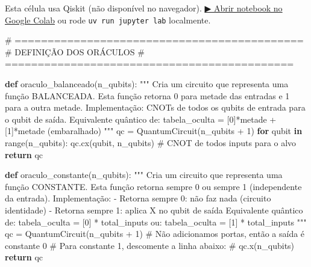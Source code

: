 \documentclass[
  brazilian,
]{report}
\newenvironment{Shaded}{\begin{snugshade}}{\end{snugshade}}
\newcommand{\BuiltInTok}[1]{\textcolor[rgb]{0.00,0.23,0.31}{#1}}
\newcommand{\CommentTok}[1]{\textcolor[rgb]{0.37,0.37,0.37}{#1}}
\newcommand{\ControlFlowTok}[1]{\textcolor[rgb]{0.00,0.23,0.31}{\textbf{#1}}}
\newcommand{\DecValTok}[1]{\textcolor[rgb]{0.68,0.00,0.00}{#1}}
\newcommand{\KeywordTok}[1]{\textcolor[rgb]{0.00,0.23,0.31}{\textbf{#1}}}
\newcommand{\NormalTok}[1]{\textcolor[rgb]{0.00,0.23,0.31}{#1}}
\newcommand{\OperatorTok}[1]{\textcolor[rgb]{0.37,0.37,0.37}{#1}}
\begin{document}
\begin{tcolorbox}[enhanced jigsaw, arc=.35mm, bottomrule=.15mm, bottomtitle=1mm, breakable, colback=white, colbacktitle=quarto-callout-warning-color!10!white, colframe=quarto-callout-warning-color-frame, coltitle=black, left=2mm, leftrule=.75mm, opacityback=0, opacitybacktitle=0.6, rightrule=.15mm, title=\textcolor{quarto-callout-warning-color}{\faExclamationTriangle}\hspace{0.5em}{⚛️ Célula Qiskit --- execute no Colab ou localmente}, titlerule=0mm, toprule=.15mm, toptitle=1mm]

Esta célula usa Qiskit (não disponível no navegador).
\href{https://colab.research.google.com/github/maxwellamaral/aula-quantum/blob/main/notebooks/05-interference.ipynb}{▶
Abrir notebook no Google Colab} ou rode \texttt{uv\ run\ jupyter\ lab}
localmente.

\begin{Shaded}
\begin{Highlighting}[]


\CommentTok{\# ============================================}
\CommentTok{\# DEFINIÇÃO DOS ORÁCULOS}
\CommentTok{\# ============================================}

\KeywordTok{def}\NormalTok{ oraculo\_balanceado(n\_qubits):}
    \CommentTok{"""}
\CommentTok{    Cria um circuito que representa uma função BALANCEADA.}
\CommentTok{    }
\CommentTok{    Esta função retorna 0 para metade das entradas e 1 para a outra metade.}
\CommentTok{    Implementação: CNOTs de todos os qubits de entrada para o qubit de saída.}
\CommentTok{    }
\CommentTok{    Equivalente quântico de: tabela\_oculta = [0]*metade + [1]*metade (embaralhado)}
\CommentTok{    """}
\NormalTok{    qc }\OperatorTok{=}\NormalTok{ QuantumCircuit(n\_qubits }\OperatorTok{+} \DecValTok{1}\NormalTok{)}
    \ControlFlowTok{for}\NormalTok{ qubit }\KeywordTok{in} \BuiltInTok{range}\NormalTok{(n\_qubits):}
\NormalTok{        qc.cx(qubit, n\_qubits) }\CommentTok{\# CNOT de todos inputs para o alvo}
    \ControlFlowTok{return}\NormalTok{ qc}

\KeywordTok{def}\NormalTok{ oraculo\_constante(n\_qubits):}
    \CommentTok{"""}
\CommentTok{    Cria um circuito que representa uma função CONSTANTE.}
\CommentTok{    }
\CommentTok{    Esta função retorna sempre 0 ou sempre 1 (independente da entrada).}
\CommentTok{    }
\CommentTok{    Implementação:}
\CommentTok{    {-} Retorna sempre 0: não faz nada (circuito identidade)}
\CommentTok{    {-} Retorna sempre 1: aplica X no qubit de saída}
\CommentTok{    }
\CommentTok{    Equivalente quântico de: tabela\_oculta = [0] * total\_inputs}
\CommentTok{                          ou: tabela\_oculta = [1] * total\_inputs}
\CommentTok{    """}
\NormalTok{    qc }\OperatorTok{=}\NormalTok{ QuantumCircuit(n\_qubits }\OperatorTok{+} \DecValTok{1}\NormalTok{)}
    \CommentTok{\# Não adicionamos portas, então a saída é constante 0}
    \CommentTok{\# Para constante 1, descomente a linha abaixo:}
    \CommentTok{\# qc.x(n\_qubits)}
    \ControlFlowTok{return}\NormalTok{ qc}
\end{Highlighting}
\end{Shaded}

\end{tcolorbox}
\end{document}
